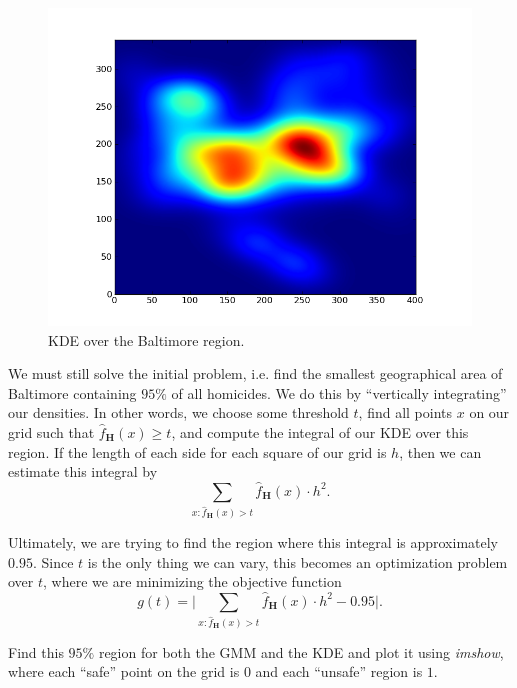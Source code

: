 \begin{figure}[h]
\centering
\includegraphics[width=\textwidth]{baltimorekde.png}
\caption{KDE over the Baltimore region.}\label{baltimorekde}
\end{figure}

We must still solve the initial problem, i.e. find the smallest geographical area of Baltimore containing $95\%$ of all homicides. We do this by ``vertically integrating'' our densities. In other words, we choose some threshold $t$, find all points $x$ on our grid such that $\widehat{f}_{\mathbf{H}}(x) \geq t$, and compute the integral of our KDE over this region. If the length of each side for each square of our grid is $h$, then we can estimate this integral by $$\sum_{x : \widehat{f}_{\mathbf{H}}(x) > t} \widehat{f}_{\mathbf{H}}(x)\cdot h^{2}.$$

Ultimately, we are trying to find the region where this integral is approximately $0.95$. Since $t$ is the only thing we can vary, this becomes an optimization problem over $t$, where we are minimizing the objective function $$g(t) = \lvert \sum_{x : \widehat{f}_{\mathbf{H}}(x) > t} \widehat{f}_{\mathbf{H}}(x)\cdot h^{2} - 0.95 \rvert.$$

\begin{problem}
Find this $95\%$ region for both the GMM and the KDE and plot it using \emph{imshow}, where each ``safe'' point on the grid is $0$ and each ``unsafe'' region is $1$.
\end{problem}
